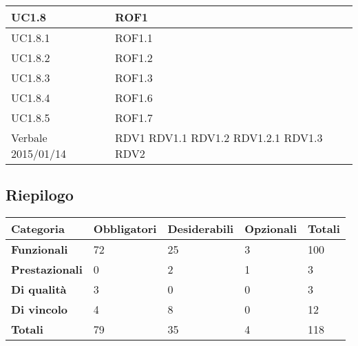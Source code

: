 \begin{center}
\begin{longtable}{| p{4cm} | p{4cm} |}
		\hline
		UC1.8  &  ROF1 \\
		\hline
		UC1.8.1  &  ROF1.1 \\
		\hline
		UC1.8.2  &  ROF1.2 \\
		\hline
		UC1.8.3  &  ROF1.3 \\
		\hline
		UC1.8.4  &  ROF1.6 \\
		\hline
		UC1.8.5  &  ROF1.7 \\
		\hline
		Verbale 2015/01/14  &  RDV1 \newline RDV1.1 \newline RDV1.2 \newline RDV1.2.1 \newline RDV1.3 \newline RDV2 \\
		\hline

	\end{longtable}
	\egroup
	\end{center}


\subsection{Riepilogo}

\begin{center}

	\def\arraystretch{1.5}
	\bgroup
	\begin{longtable}{| p{2.7cm} | p{2.4cm} | p{2.4cm} | p{2.4cm} | p{1.7cm} |}

		\hline
		\textbf{Categoria} & \textbf{Obbligatori} & \textbf{Desiderabili} & \textbf{Opzionali} & \textbf{Totali} \\
		\hline

		\textbf{Funzionali}  & 72 & 25 & 3 & 100\\
		\hline
		\textbf{Prestazionali} & 0 & 2 & 1 & 3\\
		\hline
		\textbf{Di qualità} & 3 & 0 & 0 & 3\\
		\hline
		\textbf{Di vincolo} & 4 & 8 & 0 & 12\\
		\hline
		\textbf{Totali}  & 79 & 35 & 4 & 118\\
		\hline
	\end{longtable}
	\egroup
\end{center}

